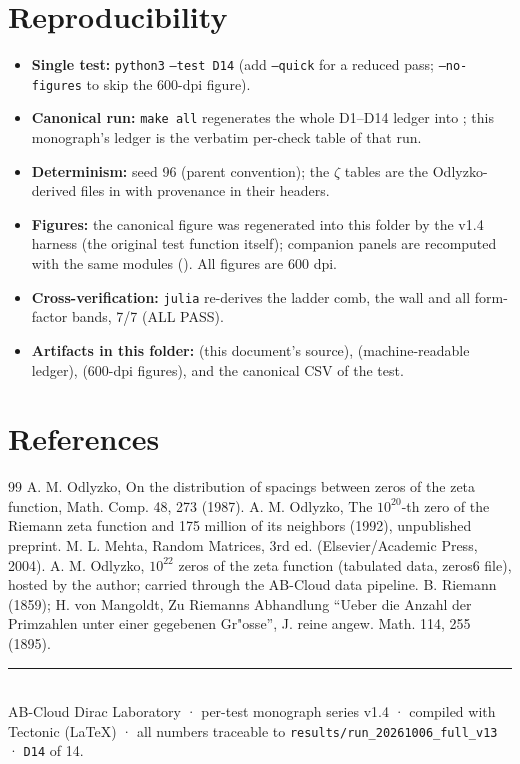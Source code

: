 \documentclass[11pt,a4paper]{article}
\begin{document}
\section{Reproducibility}
\begin{itemize}[leftmargin=1.2em, itemsep=0.15em]
\item \textbf{Single test:} \texttt{python3}  \texttt{--test D14} (add \texttt{--quick} for a reduced pass; \texttt{--no-figures} to skip the 600-dpi figure).
\item \textbf{Canonical run:} \texttt{make all} regenerates the whole D1--D14 ledger into ; this monograph's ledger is the verbatim per-check table of that run.
\item \textbf{Determinism:} seed 96 (parent convention); the $\zeta$ tables are the Odlyzko-derived files in  with provenance in their headers.
\item \textbf{Figures:} the canonical figure was regenerated into this folder by the v1.4 harness (the original test function itself); companion panels are recomputed with the same modules (). All figures are 600 dpi.
\item \textbf{Cross-verification:} \texttt{julia}  re-derives the ladder comb, the wall and all form-factor bands, 7/7 (ALL PASS).
\item \textbf{Artifacts in this folder:}  (this document's source),  (machine-readable ledger),  (600-dpi figures), and the canonical CSV of the test.
\end{itemize}

\section*{References}
\begin{thebibliography}{99}\small
{} A. M. Odlyzko, On the distribution of spacings between zeros of the zeta function, Math. Comp. 48, 273 (1987).
 A. M. Odlyzko, The $10^{20}$-th zero of the Riemann zeta function and 175 million of its neighbors (1992), unpublished preprint.
 M. L. Mehta, Random Matrices, 3rd ed. (Elsevier/Academic Press, 2004).
 A. M. Odlyzko, $10^{22}$ zeros of the zeta function (tabulated data, zeros6 file), hosted by the author; carried through the AB-Cloud data pipeline.
 B. Riemann (1859); H. von Mangoldt, Zu Riemanns Abhandlung ``Ueber die Anzahl der Primzahlen unter einer gegebenen Gr"osse'', J. reine angew. Math. 114, 255 (1895).
\end{thebibliography}

\vfill
\noindent\rule{\textwidth}{0.4pt}\\[0.2em]
{\footnotesize\color{labgray} AB-Cloud Dirac Laboratory · per-test monograph series v1.4 · compiled with Tectonic (LaTeX) · all numbers traceable to \texttt{results/run\_20261006\_full\_v13} · \texttt{D14} of 14.}
\end{document}
